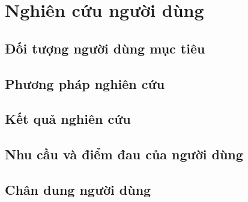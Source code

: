 \section{Nghiên cứu người dùng}

\subsection{Đối tượng người dùng mục tiêu}

\subsection{Phương pháp nghiên cứu}

\subsection{Kết quả nghiên cứu}

\subsection{Nhu cầu và điểm đau của người dùng}

\subsection{Chân dung người dùng}

